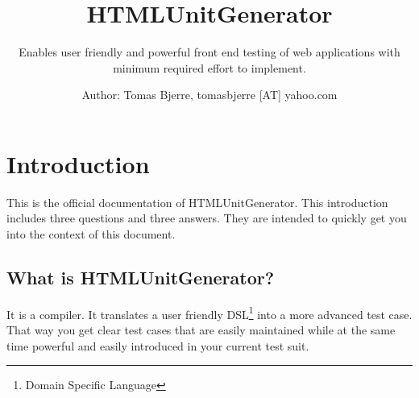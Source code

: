 \documentclass[a4paper,11pt]{kth-mag}
\title{HTMLUnitGenerator}
\subtitle{Enables user friendly and powerful front end testing of web applications with minimum required effort to implement.}
\author{Author: Tomas Bjerre, tomasbjerre [AT] yahoo.com}
\begin{document}
\frontmatter
\pagestyle{empty}
\removepagenumbers
\maketitle

\tableofcontents*
\mainmatter

\pagestyle{newchap}
\chapter{Introduction}
This is the official documentation of HTMLUnitGenerator. This introduction includes three questions and three answers. They are intended to quickly get you into the context of this document.

\section{What is HTMLUnitGenerator?}
It is a compiler. It translates a user friendly DSL\footnote{Domain Specific Language} into a more advanced test case. That way you get clear test cases that are easily maintained while at the same time powerful and easily introduced in your current test suit.
\end{document}

